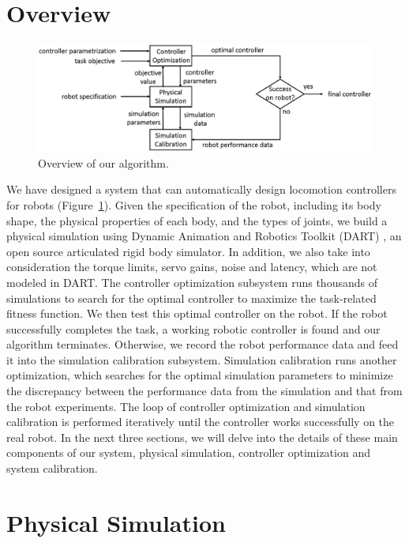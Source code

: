 \section{Overview}

\begin{figure}[!t]
  \centering
  \includegraphics[width=6in]{figures/controllerTransfer}
  \caption{Overview of our algorithm.}
  \label{fig:controllerTransferOverview}
\end{figure}

We have designed a system that can automatically design locomotion controllers for robots (Figure~\ref{fig:controllerTransferOverview}). Given the specification of the robot, including its body shape, the physical properties of each body, and the types of joints, we build a physical simulation using Dynamic Animation and Robotics Toolkit (DART) \cite{dart:2012}, an open source articulated rigid body simulator. In addition, we also take into consideration the torque limits, servo gains, noise and latency, which are not modeled in DART. The controller optimization subsystem runs thousands of simulations to search for the optimal controller to maximize the task-related fitness function. We then test this optimal controller on the robot. If the robot successfully completes the task, a working robotic controller is found and our algorithm terminates. Otherwise, we record the robot performance data and feed it into the simulation calibration subsystem. Simulation calibration runs another optimization, which searches for the optimal simulation parameters to minimize the discrepancy between the performance data from the simulation and that from the robot experiments. The loop of controller optimization and simulation calibration is performed iteratively until the controller works successfully on the real robot. In the next three sections, we will delve into the details of these main components of our system, physical simulation, controller optimization and system calibration.

\section{Physical Simulation}

